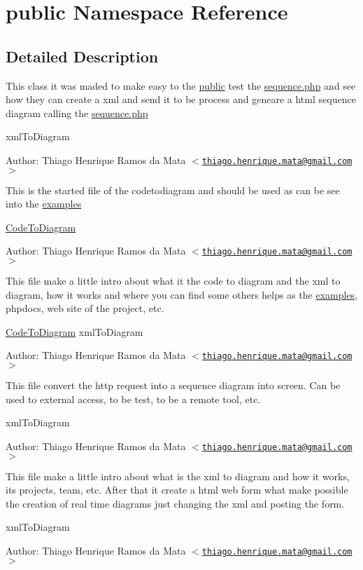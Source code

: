 \hypertarget{namespacepublic}{
\section{public Namespace Reference}
\label{namespacepublic}
}


\subsection{Detailed Description}
This class it was maded to make easy to the \hyperlink{namespacepublic}{public} test the \hyperlink{sequence_8php}{sequence.php} and see how they can create a xml and send it to be process and geneare a html sequence diagram calling the \hyperlink{sequence_8php}{sequence.php}

xmlToDiagram \begin{Desc}
\item[Author:]Thiago Henrique Ramos da Mata $<$\href{mailto:thiago.henrique.mata@gmail.com}{\tt thiago.henrique.mata@gmail.com}$>$\end{Desc}
This is the started file of the codetodiagram and should be used as can be see into the \hyperlink{namespaceexamples}{examples}

\hyperlink{namespace_code_to_diagram}{CodeToDiagram} \begin{Desc}
\item[Author:]Thiago Henrique Ramos da Mata $<$\href{mailto:thiago.henrique.mata@gmail.com}{\tt thiago.henrique.mata@gmail.com}$>$\end{Desc}
This file make a little intro about what it the code to diagram and the xml to diagram, how it works and where you can find some others helps as the \hyperlink{namespaceexamples}{examples}, phpdocs, web site of the project, etc.

\hyperlink{namespace_code_to_diagram}{CodeToDiagram}  xmlToDiagram \begin{Desc}
\item[Author:]Thiago Henrique Ramos da Mata $<$\href{mailto:thiago.henrique.mata@gmail.com}{\tt thiago.henrique.mata@gmail.com}$>$\end{Desc}
This file convert the http request into a sequence diagram into screen. Can be used to external access, to be test, to be a remote tool, etc.

xmlToDiagram \begin{Desc}
\item[Author:]Thiago Henrique Ramos da Mata $<$\href{mailto:thiago.henrique.mata@gmail.com}{\tt thiago.henrique.mata@gmail.com}$>$\end{Desc}
This file make a little intro about what is the xml to diagram and how it works, its projects, team, etc. After that it create a html web form what make possible the creation of real time diagrams just changing the xml and posting the form.

xmlToDiagram \begin{Desc}
\item[Author:]Thiago Henrique Ramos da Mata $<$\href{mailto:thiago.henrique.mata@gmail.com}{\tt thiago.henrique.mata@gmail.com}$>$ \end{Desc}


